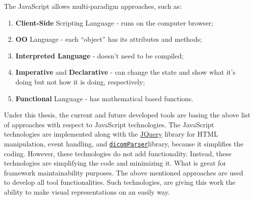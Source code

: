 \hfill

\noindent
The JavaScript allows multi-paradigm approaches, such as:

\begin{enumerate}
\item {\bf Client-Side} Scripting Language - runs on the computer browser;
\item {\bf \ac{OO}} Language - each ``object'' has its attributes and methods;
\item {\bf Interpreted Language} - doesn't need to be compiled;
\item {\bf Imperative} and \textbf{Declarative} - can change the state and show what it's doing but not how it is doing, respectively;
\item {\bf Functional} Language - has mathematical based functions.
\end{enumerate}

Under this thesis, the current and future developed tools are basing the above list of approaches with respect to JavaScript technologies.
The JavaScript technologies are implemented along with the \href{https://jquery.com/}{JQuery} library for \ac{HTML} manipulation, event handling, and \href{https://github.com/cornerstonejs/dicomParser}{\texttt{dicomParser}}\footnotemark[17] library, because it simplifies the coding.
However, these technologies do not add functionality.
Instead, these technologies are simplifying the code and minimizing it.
What is great for framework maintainability purposes.
The above mentioned approaches are used to develop all tool functionalities.
Such technologies, are giving this work the ability to make visual representations on an easily way.



